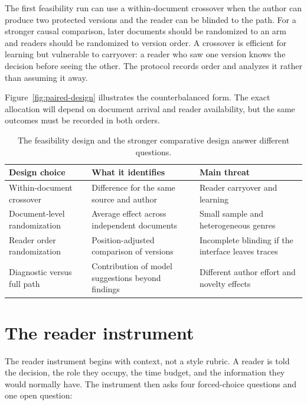 The first feasibility run can use a within-document crossover when the author
can produce two protected versions and the reader can be blinded to the path.
For a stronger causal comparison, later documents should be randomized to an
arm and readers should be randomized to version order. A crossover is efficient
for learning but vulnerable to carryover: a reader who saw one version knows
the decision before seeing the other. The protocol records order and analyzes
it rather than assuming it away.

Figure~\ref{fig:paired-design} illustrates the counterbalanced form. The exact
allocation will depend on document arrival and reader availability, but the
same outcomes must be recorded in both orders.

\hvFigurePairedDesign

\begin{table}[H]
\centering
\small
\begin{tabularx}{\textwidth}{@{}p{}L p{0.27\textwidth}@{}}
\toprule
Design choice & What it identifies & Main threat \\
\midrule
Within-document crossover & Difference for the same source and author & Reader
carryover and learning \\
Document-level randomization & Average effect across independent documents &
Small sample and heterogeneous genres \\
Reader order randomization & Position-adjusted comparison of versions & Incomplete
blinding if the interface leaves traces \\
Diagnostic versus full path & Contribution of model suggestions beyond findings &
Different author effort and novelty effects \\
\bottomrule
\end{tabularx}
\caption{The feasibility design and the stronger comparative design answer
different questions.}
\label{tab:eval-design-choices}
\end{table}

\section{The reader instrument}
\label{sec:eval-reader-instrument}

The reader instrument begins with context, not a style rubric. A reader is told
the decision, the role they occupy, the time budget, and the information they
would normally have. The instrument then asks four forced-choice questions and
one open question:

